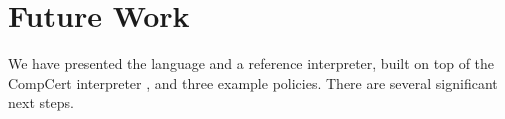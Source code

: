 \documentclass{llncs}
\begin{document}




\section{Future Work}
\label{sec:futurework}

We have presented the language and a reference interpreter, built on top of the CompCert interpreter
\cite{Leroy09:CompCert}, and three example policies. There are several significant next steps.
\end{document}
